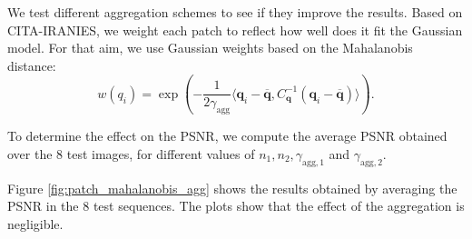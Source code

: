 \documentclass{ipol}
\newcommand{\ma}[1]{\boldsymbol{#1}}
\begin{document}
We test different aggregation schemes to see if they improve the results. Based on
CITA-IRANIES, we weight each patch to reflect how well does it fit the Gaussian model.
For that aim, we use Gaussian weights based on the Mahalanobis distance:
\[w(q_i) = \exp\left(-\frac1{2\gamma_{\text{agg}}} 
\langle \ma q_i - \overline{\ma q}, C_{\ma q}^{-1}(\ma q_i - \overline{\ma q})\rangle\right). \]

To determine the effect on the PSNR, we compute the average PSNR obtained over
the 8 test images, for different values of $n_1, n_2, \gamma_{\text{agg},1}$
and $\gamma_{\text{agg},2}$.

Figure \ref{fig:patch_mahalanobis_agg} shows the results obtained by averaging the PSNR
in the 8 test sequences. The plots show that the effect of the aggregation is negligible.
\end{document}
